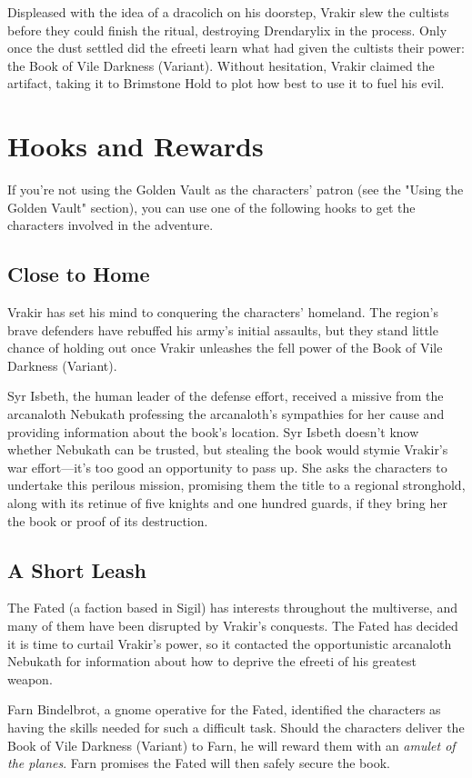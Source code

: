 \documentclass[10pt,a4paper,twoside,bg=print,twocolumn,openany,nodeprecatedcode]{dndbook}
\begin{document}
Displeased with the idea of a dracolich on his doorstep, Vrakir slew the cultists before they could finish the ritual, destroying Drendarylix in the process. Only once the dust settled did the efreeti learn what had given the cultists their power: the Book of Vile Darkness (Variant). Without hesitation, Vrakir claimed the artifact, taking it to Brimstone Hold to plot how best to use it to fuel his evil.

\section{Hooks and Rewards}
If you're not using the Golden Vault as the characters' patron (see the "Using the Golden Vault" section), you can use one of the following hooks to get the characters involved in the adventure.

\subsection{Close to Home}
Vrakir has set his mind to conquering the characters' homeland. The region's brave defenders have rebuffed his army's initial assaults, but they stand little chance of holding out once Vrakir unleashes the fell power of the Book of Vile Darkness (Variant).

Syr Isbeth, the human leader of the defense effort, received a missive from the arcanaloth Nebukath professing the arcanaloth's sympathies for her cause and providing information about the book's location. Syr Isbeth doesn't know whether Nebukath can be trusted, but stealing the book would stymie Vrakir's war effort—it's too good an opportunity to pass up. She asks the characters to undertake this perilous mission, promising them the title to a regional stronghold, along with its retinue of five knights and one hundred guards, if they bring her the book or proof of its destruction.

\subsection{A Short Leash}
The Fated (a faction based in Sigil) has interests throughout the multiverse, and many of them have been disrupted by Vrakir's conquests. The Fated has decided it is time to curtail Vrakir's power, so it contacted the opportunistic arcanaloth Nebukath for information about how to deprive the efreeti of his greatest weapon.

Farn Bindelbrot, a gnome operative for the Fated, identified the characters as having the skills needed for such a difficult task. Should the characters deliver the Book of Vile Darkness (Variant) to Farn, he will reward them with an \textit{amulet of the planes}. Farn promises the Fated will then safely secure the book.
\end{document}
